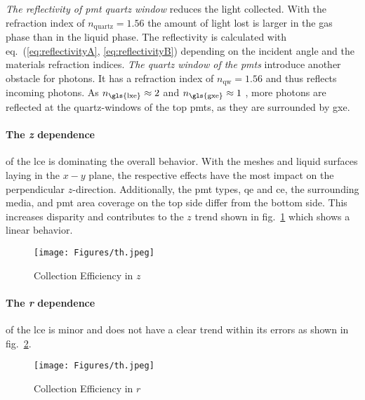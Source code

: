 \emph{The reflectivity of \gls{pmt} quartz window} reduces the light collected. With the refraction index of $ n_\mathrm{quartz} = 1.56 $ the amount of light lost is larger in the gas phase than in the liquid phase. The reflectivity is calculated with eq.~(\ref{eq:reflectivityA}, \ref{eq:reflectivityB}) depending on the incident angle and the materials refraction indices.
\emph{The quartz window of the \glspl{pmt}} introduce another obstacle for photons.
It has a refraction index of $ n_\mathrm{qw} = 1.56 $ and thus reflects incoming photons.
As $ n_\mathrm{\gls{lxe}} \approx 2 $ and $ n_\mathrm{\gls{gxe}} \approx 1 $ , more photons are reflected at the quartz-windows of the top \glspl{pmt}, as they are surrounded by \gls{gxe}.


\paragraph{The \emph{z} dependence} of the \gls{lce} is dominating the overall behavior.
With the meshes and liquid surfaces laying in the $ x-y $ plane, the respective effects have the most impact on the perpendicular $ z $-direction.
Additionally, the \gls{pmt} types, \gls{qe} and \gls{ce}, the surrounding media, and \gls{pmt} area coverage on the top side differ from the bottom side.
This increases disparity and contributes to the $ z $ trend shown in fig.~\ref{fig:ce_vs_z} which shows a linear behavior.


\begin{figure}
\centering
\texttt{[image: Figures/th.jpeg]}  %
\caption[Collection Efficiency in $ z $]{
        Collection Efficiency in $ z $
    }
\label{fig:ce_vs_z}
\end{figure}

\paragraph{The \emph{r} dependence} of the \gls{lce} is minor and does not have a clear trend within its errors as shown in fig.~\ref{fig:ce_vs_r}.

\begin{figure}
\centering
    \texttt{[image: Figures/th.jpeg]}  %
\caption[Collection Efficiency in $ r $]{
    Collection Efficiency in $ r $
    }
\label{fig:ce_vs_r}
\end{figure}

